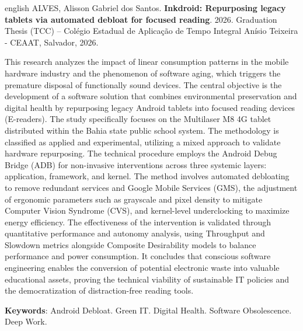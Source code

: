 \documentclass[
    12pt,
    openright,
    oneside,
    a4paper,
    english,
    brazilian
    ]{abntex2}
\begin{document}
\begin{resumo}[Abstract]
\begin{otherlanguage*}{english}
\noindent ALVES, Alisson Gabriel dos Santos. \textbf{Inkdroid: Repurposing legacy tablets via automated debloat for focused reading}. 2026. Graduation Thesis (TCC) -- Colégio Estadual de Aplicação de Tempo Integral Anísio Teixeira - CEAAT, Salvador, 2026.

\vspace{\onelineskip}

This research analyzes the impact of linear consumption patterns in the mobile hardware industry and the phenomenon of software aging, which triggers the premature disposal of functionally sound devices. The central objective is the development of a software solution that combines environmental preservation and digital health by repurposing legacy Android tablets into focused reading devices (E-readers). The study specifically focuses on the Multilaser M8 4G tablet distributed within the Bahia state public school system. The methodology is classified as applied and experimental, utilizing a mixed approach to validate hardware repurposing. The technical procedure employs the Android Debug Bridge (ADB) for non-invasive interventions across three systemic layers: application, framework, and kernel. The method involves automated debloating to remove redundant services and Google Mobile Services (GMS), the adjustment of ergonomic parameters such as grayscale and pixel density to mitigate Computer Vision Syndrome (CVS), and kernel-level underclocking to maximize energy efficiency. The effectiveness of the intervention is validated through quantitative performance and autonomy analysis, using Throughput and Slowdown metrics alongside Composite Desirability models to balance performance and power consumption. It concludes that conscious software engineering enables the conversion of potential electronic waste into valuable educational assets, proving the technical viability of sustainable IT policies and the democratization of distraction-free reading tools.

\vspace{\onelineskip}
\noindent \textbf{Keywords}: Android Debloat. Green IT. Digital Health. Software Obsolescence. Deep Work.
\end{otherlanguage*}
\end{resumo}

\tableofcontents*
\cleardoublepage
\end{document}
